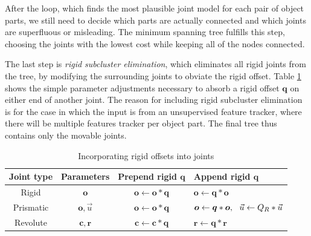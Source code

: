 \documentclass[letterpaper, 10 pt, conference]{ieeeconf}  %
\def\xmat{\uppercase}    \def\xmatstr{in uppercase}
\def\xvec{\vec}          \def\xvecstr{with an arrow}
\def\xse{\bm}            \def\xsestr{in boldface}
\begin{document}
After the loop, which finds the most plausible joint model for each pair of object parts, we still need to decide which parts are actually connected and which joints are superfluous or misleading. The minimum spanning tree fulfills this step, choosing the joints with the lowest cost while keeping all of the nodes connected.

The last step is \emph{rigid subcluster elimination}, which eliminates all rigid joints from the tree, by modifying the surrounding joints to obviate the rigid offset. Table \ref{tbl:move} shows the simple parameter adjustments necessary to absorb a rigid offset $\xse{q}$ on either end of another joint. The reason for including rigid subcluster elimination is for the case in which the input is from an unsupervised feature tracker, where there will be multiple features tracker per object part. The final tree thus contains only the movable joints.

\begin{table}[ht]
  \begin{tabular}{c|c|c|l}
    Joint type & Parameters & Prepend rigid $\xse{q}$ & Append rigid $\xse{q}$ \\
    \hline
    Rigid & $\xse{o}$ & $\xse{o} \leftarrow \xse{o}*\xse{q}$ & $\xse{o} \leftarrow \xse{q}*\xse{o}$ \\
    Prismatic & $\xse{o}, \xvec{u}$ & $\xse{o} \leftarrow \xse{o}*\xse{q}$ & $\xse{o} \leftarrow \xse{q}*\xse{o},~ ~ \xvec{u} \leftarrow \xmat{q}_R*\xvec{u}$ \\
    Revolute & $\xse{c}, \xse{r}$ & $\xse{c} \leftarrow \xse{c}*\xse{q}$ & $\xse{r} \leftarrow \xse{q}*\xse{r}$ \\
  \end{tabular}
  \caption{Incorporating rigid offsets into joints}
  \label{tbl:move}
\end{table}
\end{document}
